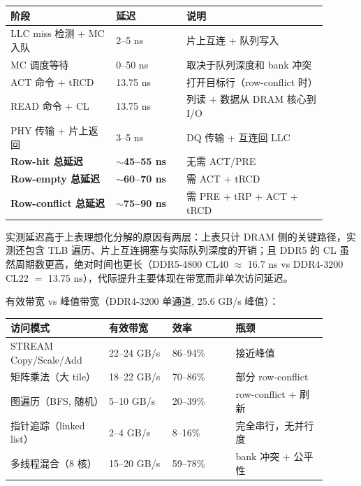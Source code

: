 \begin{longtable}{L{0.3\linewidth}L{0.2\linewidth}L{0.4\linewidth}}
\toprule
阶段 & 延迟 & 说明 \\
\midrule
LLC miss 检测 + MC 入队 & 2--5 ns & 片上互连 + 队列写入 \\\tablerowrule
MC 调度等待 & 0--50 ns & 取决于队列深度和 bank 冲突 \\\tablerowrule
ACT 命令 + tRCD & 13.75 ns & 打开目标行（row-conflict 时） \\\tablerowrule
READ 命令 + CL & 13.75 ns & 列读 + 数据从 DRAM 核心到 I/O \\\tablerowrule
PHY 传输 + 片上返回 & 3--5 ns & DQ 传输 + 互连回 LLC \\
\midrule
\textbf{Row-hit 总延迟} & \textbf{$\sim$45--55 ns} & 无需 ACT/PRE \\\tablerowrule
\textbf{Row-empty 总延迟} & \textbf{$\sim$60--70 ns} & 需 ACT + tRCD \\\tablerowrule
\textbf{Row-conflict 总延迟} & \textbf{$\sim$75--90 ns} & 需 PRE + tRP + ACT + tRCD \\
\bottomrule
\end{longtable}


实测延迟高于上表理想化分解的原因有两层：上表只计 DRAM 侧的关键路径，实测还包含 TLB 遍历、片上互连拥塞与实际队列深度的开销；且 DDR5 的 CL 虽然周期数更高，绝对时间也更长（DDR5-4800 CL40 $\approx$ 16.7 ns vs DDR4-3200 CL22 $=$ 13.75 ns），代际提升主要体现在带宽而非单次访问延迟。

有效带宽 vs 峰值带宽（DDR4-3200 单通道, 25.6 GB/s 峰值）：

\begin{longtable}{L{0.28\linewidth}L{0.18\linewidth}L{0.18\linewidth}L{0.26\linewidth}}
\toprule
访问模式 & 有效带宽 & 效率 & 瓶颈 \\
\midrule
STREAM Copy/Scale/Add & 22--24 GB/s & 86--94\% & 接近峰值 \\\tablerowrule
矩阵乘法（大 tile） & 18--22 GB/s & 70--86\% & 部分 row-conflict \\\tablerowrule
图遍历（BFS, 随机） & 5--10 GB/s & 20--39\% & row-conflict + 刷新 \\\tablerowrule
指针追踪（linked list） & 2--4 GB/s & 8--16\% & 完全串行，无并行度 \\\tablerowrule
多线程混合（8 核） & 15--20 GB/s & 59--78\% & bank 冲突 + 公平性 \\
\bottomrule
\end{longtable}

